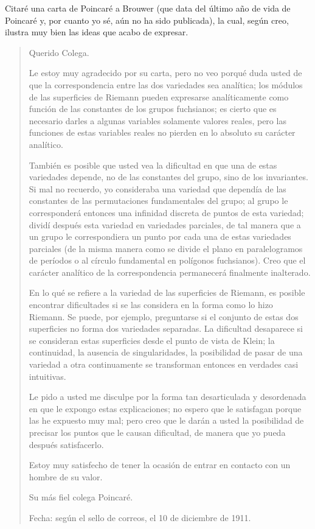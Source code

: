 \documentclass[a4paper, 12pt]{article}
\begin{document}
 Citaré una carta de  Poincaré a Brouwer (que data del último año de vida de Poincaré y, por cuanto yo sé, aún no ha sido publicada), la cual, según creo, ilustra muy bien las ideas
que acabo de expresar.

\begin{quote} \small

Querido Colega.

\indent Le estoy muy agradecido por su carta, pero no veo porqué duda usted de que la correspondencia entre las dos variedades sea analítica; los módulos de las superficies de Riemann pueden expresarse analíticamente como función de las constantes de los grupos fuchsianos; es cierto que es necesario darles a algunas variables solamente valores reales, pero las funciones de estas variables
reales no pierden en lo absoluto su carácter analítico.

 También es posible que usted vea la dificultad en que una de estas variedades depende, no de las constantes del grupo, sino de los invariantes. Si mal no recuerdo, yo consideraba una variedad que dependía de las constantes de las permutaciones fundamentales del grupo; al grupo le corresponderá entonces una infinidad discreta de puntos de esta variedad; dividí después esta variedad en variedades parciales, de tal manera que a un grupo le correspondiera un punto por cada una de estas variedades parciales (de la misma manera como se divide el plano en paralelogramos de períodos o al círculo fundamental en polígonos fuchsianos). Creo que el carácter analítico de la correspondencia permanecerá finalmente inalterado.

 En lo qué se refiere a la variedad de las superficies de Riemann, es posible encontrar dificultades si se las considera en la forma como lo hizo Riemann. Se puede, por ejemplo, preguntarse si el conjunto de estas dos superficies no forma dos variedades separadas. La dificultad desaparece si se consideran estas superficies desde el punto de vista de Klein; la continuidad, la ausencia de singularidades, la posibilidad de pasar de una variedad a otra continuamente se transforman entonces en verdades casi intuitivas.

 Le pido a usted me disculpe por la forma tan desarticulada y desordenada en que le expongo estas explicaciones; no espero que le satisfagan porque las he expuesto muy mal; pero creo que le darán a usted la posibilidad de precisar los puntos que le causan dificultad, de manera que yo pueda después satisfacerlo.


 Estoy muy satisfecho de tener la ocasión de entrar en contacto
con un hombre de su valor.

\hfill Su más fiel colega Poincaré.

Fecha: según el sello de correos, el 10 de diciembre de 1911.

\end{quote}
\end{document}

